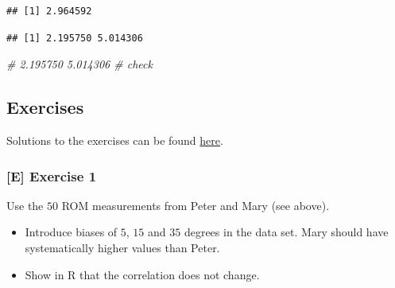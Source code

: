 \documentclass[
]{article}
\newenvironment{Shaded}{\begin{snugshade}}{\end{snugshade}}
\newcommand{\AttributeTok}[1]{\textcolor[rgb]{0.13,0.29,0.53}{#1}}
\newcommand{\CommentTok}[1]{\textcolor[rgb]{0.56,0.35,0.01}{\textit{#1}}}
\newcommand{\ConstantTok}[1]{\textcolor[rgb]{0.56,0.35,0.01}{#1}}
\newcommand{\DecValTok}[1]{\textcolor[rgb]{0.00,0.00,0.81}{#1}}
\newcommand{\FloatTok}[1]{\textcolor[rgb]{0.00,0.00,0.81}{#1}}
\newcommand{\FunctionTok}[1]{\textcolor[rgb]{0.13,0.29,0.53}{\textbf{#1}}}
\newcommand{\NormalTok}[1]{#1}
\newcommand{\SpecialCharTok}[1]{\textcolor[rgb]{0.81,0.36,0.00}{\textbf{#1}}}
\providecommand{\tightlist}{%
  \setlength{\itemsep}{0pt}\setlength{\parskip}{0pt}}
\begin{document}
\begin{verbatim}
## [1] 2.964592
\end{verbatim}

\begin{Shaded}
\end{Shaded}

\begin{verbatim}
## [1] 2.195750 5.014306
\end{verbatim}

\begin{Shaded}
\begin{Highlighting}[]
\CommentTok{\# 2.195750 5.014306 \# check}
\end{Highlighting}
\end{Shaded}

\subsection{Exercises}\label{exercises}

Solutions to the exercises can be found
\href{https://github.com/jdegenfellner/Script_QM3_ZHAW/tree/main/Solutions_Exercises}{here}.

\subsubsection{{[}E{]} Exercise 1}\label{exercise1}

Use the \(50\) ROM measurements from Peter and Mary (see above).

\begin{itemize}
\tightlist
\item
  Introduce biases of \(5\), \(15\) and \(35\) degrees in the data set. Mary should have systematically
  higher values than Peter.
\item
  Show in R that the correlation does not change.
\end{itemize}
\end{document}
